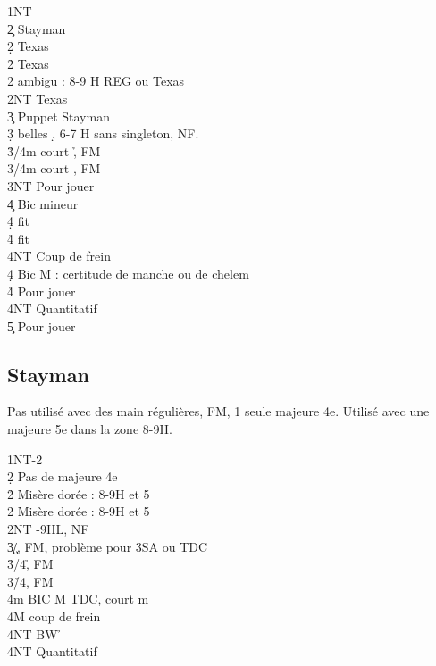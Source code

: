 \documentclass[a4paper]{article}
\begin{document}
\begin{bidtable}
1NT\+\\
2\c \> Stayman\\
2\d \> Texas \h \\
2\h \> Texas \s \\
2\s \> ambigu : 8-9 H REG ou Texas \c \\
2NT \> Texas \d \\
3\c \> Puppet Stayman\\
3\d {} belles \d , 6-7 H sans singleton, NF.\\
3\h {}/4m court \h , FM\\
3\s {}/4m court \s , FM\\
3NT \> Pour jouer\\
4\c \> Bic mineur\+\\
4\d \> fit \d \\
4\h\s \> fit \c \\
4NT \> Coup de frein\-\\
4\d \> Bic M : certitude de manche ou de chelem\\
4\h\s \> Pour jouer\\
4NT \> Quantitatif\\
5\c\d \> Pour jouer\-
\end{bidtable}

\subsection{Stayman}

Pas utilisé avec des main régulières, FM, 1 seule majeure 4e.
Utilisé avec une majeure 5e dans la zone 8-9H.

\begin{bidtable}
1NT-2\c\\
2\d \> Pas de majeure 4e\+\\
2\h \> Misère dorée : 8-9H et 5\h \\
2\s \> Misère dorée : 8-9H et 5\s \\
2NT -9HL, NF\\
3\c\d {}\c /\d , FM, problème pour 3SA ou TDC\\
3\h {}\s /4\h , FM\\
3\s {}\h /4\s , FM\\
4m \> BIC M TDC, court m\+\\
4M \> coup de frein\\
4NT \> BW \h \-\\
4NT \> Quantitatif\-
\end{bidtable}
\end{document}
